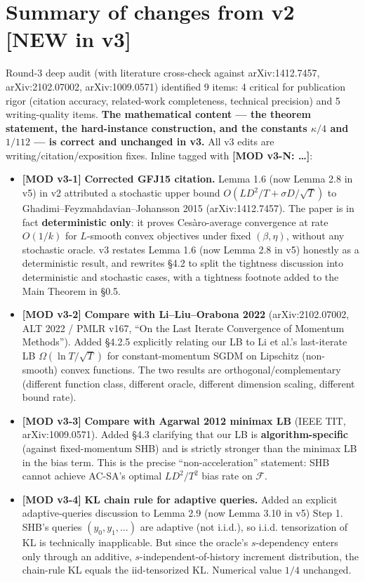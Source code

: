 \documentclass[11pt,a4paper]{article}
\theoremstyle{plain}
\theoremstyle{definition}
\theoremstyle{remark}
\newcommand{\F}{\mathcal{F}}
\begin{document}
\section*{Summary of changes from v2 [NEW in v3]}

Round-3 deep audit (with literature cross-check against arXiv:1412.7457, arXiv:2102.07002, arXiv:1009.0571) identified 9 items: 4 critical for publication rigor (citation accuracy, related-work completeness, technical precision) and 5 writing-quality items. \textbf{The mathematical content --- the theorem statement, the hard-instance construction, and the constants $\kappa/4$ and $1/112$ --- is correct and unchanged in v3.} All v3 edits are writing/citation/exposition fixes. Inline tagged with \textbf{[MOD v3-N: \ldots]}:

\begin{itemize}[leftmargin=*]
\item \textbf{[MOD v3-1]} \textbf{Corrected GFJ15 citation.} Lemma 1.6 (now Lemma 2.8 in v5) in v2 attributed a stochastic upper bound $O(LD^2/T + \sigma D/\sqrt T)$ to Ghadimi--Feyzmahdavian--Johansson 2015 (arXiv:1412.7457). The paper is in fact \textbf{deterministic only}: it proves Ces\`aro-average convergence at rate $O(1/k)$ for $L$-smooth convex objectives under fixed $(\beta,\eta)$, without any stochastic oracle. v3 restates Lemma 1.6 (now Lemma 2.8 in v5) honestly as a deterministic result, and rewrites \S4.2 to split the tightness discussion into deterministic and stochastic cases, with a tightness footnote added to the Main Theorem in \S0.5.
\item \textbf{[MOD v3-2]} \textbf{Compare with Li--Liu--Orabona 2022} (arXiv:2102.07002, ALT 2022 / PMLR v167, ``On the Last Iterate Convergence of Momentum Methods''). Added \S4.2.5 explicitly relating our LB to Li et al.'s last-iterate LB $\Omega(\ln T/\sqrt T)$ for constant-momentum SGDM on Lipschitz (non-smooth) convex functions. The two results are orthogonal/complementary (different function class, different oracle, different dimension scaling, different bound rate).
\item \textbf{[MOD v3-3]} \textbf{Compare with Agarwal 2012 minimax LB} (IEEE TIT, arXiv:1009.0571). Added \S4.3 clarifying that our LB is \textbf{algorithm-specific} (against fixed-momentum SHB) and is strictly stronger than the minimax LB in the bias term. This is the precise ``non-acceleration'' statement: SHB cannot achieve AC-SA's optimal $LD^2/T^2$ bias rate on $\F$.
\item \textbf{[MOD v3-4]} \textbf{KL chain rule for adaptive queries.} Added an explicit adaptive-queries discussion to Lemma 2.9 (now Lemma 3.10 in v5) Step 1. SHB's queries $(y_0, y_1, \ldots)$ are adaptive (not i.i.d.), so i.i.d. tensorization of KL is technically inapplicable. But since the oracle's $s$-dependency enters only through an additive, $s$-independent-of-history increment distribution, the chain-rule KL equals the iid-tensorized KL. Numerical value $1/4$ unchanged.

\end{itemize}
\end{document}
